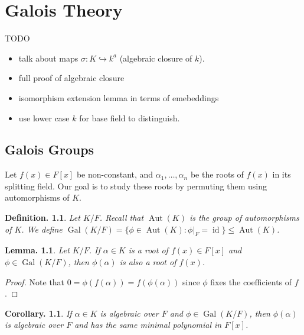 \documentclass[11pt, a4paper]{memoir}
\theoremstyle{change}
\newtheorem{lemma}[theorem]{Lemma.}
\newtheorem{corollary}[theorem]{Corollary.}
\theoremstyle{plain}
\theoremstyle{nonumberplain}
\newtheorem{definition}{Definition.}
\newtheorem{proof}{Proof}
\DeclareMathOperator{\Aut}{Aut}
\DeclareMathOperator{\Gal}{Gal}
\DeclareMathOperator{\id}{id}
\numberwithin{equation}{section}
\begin{document}
\chapter{Galois Theory}
TODO
\begin{itemize}[nl]
    \item talk about maps $\sigma:K\hookrightarrow k^a$ (algebraic closure of $k$).
    \item full proof of algebraic closure
    \item isomorphism extension lemma in terms of emebeddings
    \item use lower case $k$ for base field to distinguish.
\end{itemize}
\section{Galois Groups}
Let $f(x)\in F[x]$ be non-constant, and $\alpha_1,\ldots,\alpha_n$ be the roots of $f(x)$ in its splitting field.
Our goal is to study these roots by permuting them using automorphisms of $K$.
\begin{definition}
    Let $K/F$.
    Recall that $\Aut(K)$ is the group of automorphisms of $K$.
    We define $\Gal(K/F)=\{\phi\in\Aut(K):\phi|_F=\id\}\leq\Aut(K)$.
\end{definition}
\begin{lemma}
    Let $K/F$.
    If $\alpha\in K$ is a root of $f(x)\in F[x]$ and $\phi\in\Gal(K/F)$, then $\phi(\alpha)$ is also a root of $f(x)$.
\end{lemma}
\begin{proof}
    Note that $0=\phi(f(\alpha))=f(\phi(\alpha))$ since $\phi$ fixes the coefficients of $f$.
\end{proof}
\begin{corollary}
    If $\alpha\in K$ is algebraic over $F$ and $\phi\in\Gal(K/F)$, then $\phi(\alpha)$ is algebraic over $F$ and has the same minimal polynomial in $F[x]$.
\end{corollary}
\end{document}
